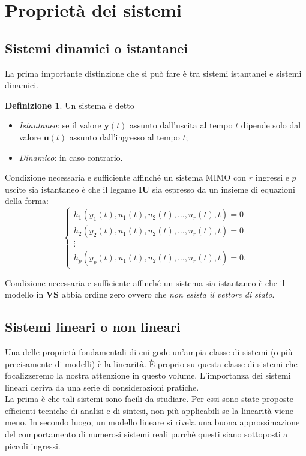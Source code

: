 \documentclass[a4paper]{article}
\renewcommand{\vec}{\bm}
\theoremstyle{definition}
\newtheorem{defn}{Definizione}[subsection]
\begin{document}
	\section{Proprietà dei sistemi}
		\subsection{Sistemi dinamici o istantanei}
			La prima importante distinzione che si può fare è tra sistemi istantanei e sistemi
			dinamici.
			
			\begin{defn}
				Un sistema è detto
				\begin{itemize}
					\item \textit{Istantaneo}: se il valore $ \vec{y}(t) $ assunto dall'uscita al tempo $ t $ dipende solo dal valore $ \vec{u}(t) $ assunto dall'ingresso al tempo $ t $;
					\item \textit{Dinamico}: in caso contrario.
				\end{itemize}
			\end{defn}
			
			Condizione necessaria e sufficiente affinché un sistema MIMO con $ r $ ingressi e $ p $ uscite sia istantaneo è che il legame \textbf{IU} sia espresso da un insieme di equazioni della forma:
			\[
				\begin{cases}
					h_1 (y_1(t),u_1(t),u_2(t),\dots, u_r(t),t) = 0 \\
					h_2 (y_2(t),u_1(t),u_2(t),\dots, u_r(t),t) = 0 \\
					\vdots \\
					h_p (y_p(t),u_1(t),u_2(t),\dots, u_r(t),t) = 0.
				\end{cases}
			\]
			
			Condizione necessaria e sufficiente affinché un sistema sia istantaneo è che il modello in \textbf{VS} abbia ordine zero ovvero che \textit{non esista il vettore di stato}.
			
		\subsection{Sistemi lineari o non lineari}
			Una delle proprietà fondamentali di cui gode un'ampia classe di sistemi (o più precisamente di modelli) è la linearità. È proprio su questa classe di sistemi che focalizzeremo la nostra attenzione in questo volume. L'importanza dei sistemi lineari deriva
			da una serie di considerazioni pratiche.\\
			La prima è che tali sistemi sono facili da studiare. Per essi sono state proposte
			efficienti tecniche di analisi e di sintesi, non più applicabili se la linearità viene meno.
			In secondo luogo, un modello lineare si rivela una buona approssimazione del
			comportamento di numerosi sistemi reali purchè questi siano sottoposti a piccoli
			ingressi.
			
\end{document}
